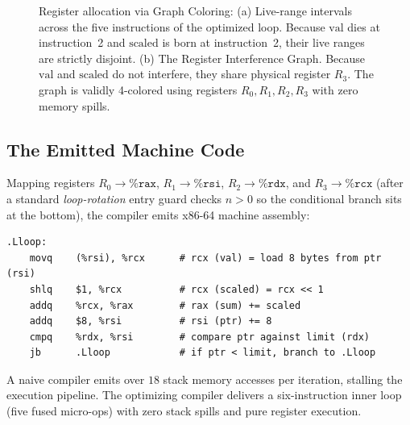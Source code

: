 \begin{figure}[H]
\caption{Register allocation via Graph Coloring: (a) Live-range intervals across the five instructions of the optimized loop. Because $\text{val}$ dies at instruction~2 and $\text{scaled}$ is born at instruction~2, their live ranges are strictly disjoint. (b) The Register Interference Graph. Because $\text{val}$ and $\text{scaled}$ do not interfere, they share physical register $R_3$. The graph is validly 4-colored using registers $R_0, R_1, R_2, R_3$ with zero memory spills.}
\label{ch41:fig-register-coloring}
\end{figure}

\subsection{The Emitted Machine Code}

Mapping registers $R_0 \to \texttt{\%rax}$, $R_1 \to \texttt{\%rsi}$, $R_2 \to \texttt{\%rdx}$,
and $R_3 \to \texttt{\%rcx}$ (after a standard \emph{loop-rotation} entry guard checks $n > 0$ so the conditional branch sits at the bottom), the compiler emits x86-64 machine assembly:
\begin{lstlisting}[language={[x86masm]Assembler}]
.Lloop:
    movq    (%rsi), %rcx      # rcx (val) = load 8 bytes from ptr (rsi)
    shlq    $1, %rcx          # rcx (scaled) = rcx << 1
    addq    %rcx, %rax        # rax (sum) += scaled
    addq    $8, %rsi          # rsi (ptr) += 8
    cmpq    %rdx, %rsi        # compare ptr against limit (rdx)
    jb      .Lloop            # if ptr < limit, branch to .Lloop
\end{lstlisting}

A naive compiler emits over $18$ stack memory accesses per iteration, stalling
the execution pipeline. The optimizing compiler delivers a six-instruction inner loop
(five fused micro-ops) with zero stack spills and pure register execution.

